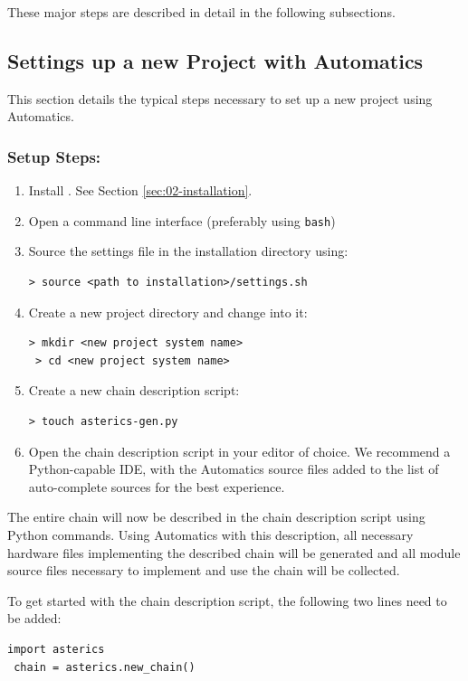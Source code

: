 These major steps are described in detail in the following subsections.


\subsection{Settings up a new Project with Automatics}
\label{ssec:02-setup}

This section details the typical steps necessary to set up a new project using Automatics.


\subsubsection{Setup Steps:}

\begin{enumerate}
\item Install \asterics. See Section \ref{sec:02-installation}.
\item Open a command line interface (preferably using \texttt{bash})
\item Source the \asterics settings file in the installation directory using:
\begin{lstlisting}[style=Shell]
 > source <path to installation>/settings.sh
\end{lstlisting}
\item Create a new project directory and change into it:
\begin{lstlisting}[style=Shell]
 > mkdir <new project system name>
 > cd <new project system name>
\end{lstlisting}
\item Create a new chain description script:
\begin{lstlisting}[style=Shell]
 > touch asterics-gen.py
\end{lstlisting}
\item Open the chain description script in your editor of choice.
We recommend a Python-capable IDE, with the Automatics source files added to the list of auto-complete sources for the best experience.
\end{enumerate}

The entire \asterics chain will now be described in the chain description script using Python commands.
Using Automatics with this description, all necessary hardware files implementing the described chain will be generated and all module source files necessary to implement and use the chain will be collected.

To get started with the chain description script, the following two lines need to be added:
\begin{lstlisting}[style=AutomaticsPython]
 import asterics
 chain = asterics.new_chain()
\end{lstlisting}

